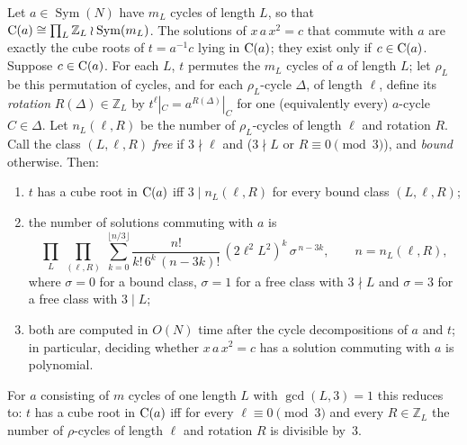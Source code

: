 \documentclass[preprint,12pt]{elsarticle}
\theoremstyle{definition}\newtheorem{defi}[thm]{Definition}\newtheorem{prob}[thm]{Problem}\newtheorem{obs}[thm]{Observation}
\theoremstyle{remark}\newtheorem{rem}[thm]{Remark}
\newcommand{\ZZ}{\mathbb Z}\newcommand{\Sym}{\operatorname{Sym}}\newcommand{\Alt}{\operatorname{Alt}}
\begin{document}
\begin{lem}\label{lem:cent}
Let $a\in\Sym(N)$ have $m_L$ cycles of length $L$, so that $\Cent(a)\cong\prod_{L}\ZZ_L\wr\Sym(m_L)$. The solutions of $x\,a\,x^{2}=c$ that commute with $a$ are exactly the cube roots of $t=a^{-1}c$ lying in $\operatorname{C}(a)$; they exist only if $c\in\operatorname{C}(a)$. Suppose $c\in\operatorname{C}(a)$. For each $L$, $t$ permutes the $m_L$ cycles of $a$ of length $L$; let $\rho_L$ be this permutation of cycles, and for each $\rho_L$-cycle $\Delta$, of length $\ell$, define its \emph{rotation} $R(\Delta)\in\ZZ_L$ by $t^{\ell}|_{C}=a^{R(\Delta)}|_{C}$ for one (equivalently every) $a$-cycle $C\in\Delta$. Let $n_{L}(\ell,R)$ be the number of $\rho_L$-cycles of length $\ell$ and rotation $R$. Call the class $(L,\ell,R)$ \emph{free} if $3\nmid\ell$ and ($3\nmid L$ or $R\equiv0\pmod3$), and \emph{bound} otherwise. Then:
\begin{enumerate}
\item[(i)] $t$ has a cube root in $\operatorname{C}(a)$ iff $3\mid n_L(\ell,R)$ for every bound class $(L,\ell,R)$;
\item[(ii)] the number of solutions commuting with $a$ is
\begin{equation}\label{eq:centcount}
\prod_{L}\ \prod_{(\ell,R)}\ \sum_{k=0}^{\lfloor n/3\rfloor}\frac{n!}{k!\,6^{k}\,(n-3k)!}\,(2\ell^{2}L^{2})^{k}\,\sigma^{\,n-3k},\qquad n=n_L(\ell,R),
\end{equation}
where $\sigma=0$ for a bound class, $\sigma=1$ for a free class with $3\nmid L$ and $\sigma=3$ for a free class with $3\mid L$;
\item[(iii)] both are computed in $O(N)$ time after the cycle decompositions of $a$ and $t$; in particular, deciding whether $x\,a\,x^{2}=c$ has a solution commuting with $a$ is polynomial.
\end{enumerate}
For $a$ consisting of $m$ cycles of one length $L$ with $\gcd(L,3)=1$ this reduces to: $t$ has a cube root in $\operatorname{C}(a)$ iff for every $\ell\equiv0\pmod 3$ and every $R\in\ZZ_L$ the number of $\rho$-cycles of length $\ell$ and rotation $R$ is divisible by~$3$.
\end{lem}
\end{document}
